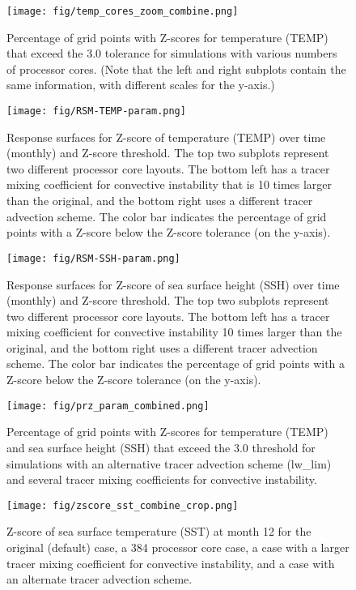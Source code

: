 \documentclass[gmd, manuscript]{copernicus}
\begin{document}
\clearpage
\begin{figure}[h]
\texttt{[image: fig/temp\_cores\_zoom\_combine.png]}
\caption{Percentage of grid points with Z-scores for temperature (TEMP) that exceed the 3.0 tolerance for simulations with various numbers of processor cores. (Note that the left and right subplots contain the same information, with different scales for the y-axis.)}
\label {fig:combine}
\end{figure}

\clearpage
\begin {figure}[h]
\centering
\texttt{[image: fig/RSM-TEMP-param.png]}
\caption {Response surfaces for Z-score of temperature (TEMP) over time (monthly) and  Z-score threshold.  The top two subplots represent two different processor core layouts.
The bottom left has a tracer mixing coefficient for convective instability that is 10 times larger than the original, and the bottom right uses a different tracer advection scheme. The color bar indicates the percentage of grid points with a Z-score below the Z-score tolerance (on the y-axis).}
\label{fig:RSM-TEMP-param}
\end {figure}

\clearpage
\begin {figure}[h]
\centering
\texttt{[image: fig/RSM-SSH-param.png]}
\caption {Response surfaces for Z-score of sea surface height (SSH) over time (monthly) and  Z-score threshold.  The top two subplots represent two different processor core layouts.
The bottom left has a tracer mixing coefficient for convective instability 10 times larger than the original, and the bottom right uses a different tracer advection scheme. The color bar indicates the percentage of grid points with a Z-score below the Z-score tolerance (on the y-axis).}
\label{fig:RSM-SSH-param}
\end {figure}


\clearpage
\begin{figure}[h]
\centering
\texttt{[image: fig/prz\_param\_combined.png]}
\caption{Percentage of grid points with Z-scores for temperature
  (TEMP) and sea surface height (SSH) that exceed the 3.0 threshold for simulations with an alternative tracer advection scheme (lw\_lim) and several tracer mixing coefficients for convective instability.}
\label {fig:PRZ-temp-param}
\end{figure}


\clearpage
\begin {figure}[h]
\centering
\texttt{[image: fig/zscore\_sst\_combine\_crop.png]}
\caption{Z-score of sea surface temperature (SST) at month 12 for the
original (default) case, a 384 processor core case, a case with a
  larger tracer mixing coefficient for convective instability, and a case with an alternate tracer advection scheme.}
\label {fig:zscore-combine}
\end {figure}
\end{document}
